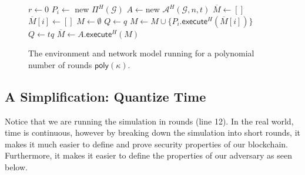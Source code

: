 \begin{figure}[H]
\begin{algorithm}[H]
    \caption{\label{alg.environment} The environment and network model running for a polynomial number of rounds $\textsf{poly}(\kappa)$.}
    \begin{algorithmic}[1]
        \State $r \leftarrow 0$
                \State $P_i \leftarrow$ {\textsf{new}} $\Pi^H(\mathcal{G})$
            \EndFor
            \State $A \leftarrow${\textsf{new}} $\mathcal{A}^H(\mathcal{G}, n, t)$
            \State $\overline{M} \leftarrow []$ 
                \State $\overline{M}[i] \leftarrow []$ 
            \EndFor
             
                \State $M \leftarrow \emptyset$
                 
                    \State $Q \leftarrow q$ 
                    \State $M \leftarrow M \cup \{P_i.\textsf{execute}^H(\overline{M}[i])\}$ 
                \EndFor
                \State $Q \leftarrow tq$ 
                \State $\overline{M} \leftarrow A.\textsf{execute}^H(M)$
                        \label{alg.environment.connectivity}
                    \EndFor
                \EndFor
            \EndFor
        \EndFunction
        \vskip8pt
    \end{algorithmic}
\end{algorithm}
\end{figure}

\subsection{A Simplification: Quantize Time}
Notice that we are running the simulation in rounds (line 12). In the real world, time is continuous, however by breaking down the simulation into short rounds, it makes it much easier to define and prove security properties of our blockchain. Furthermore, it makes it easier to define the properties of our adversary as seen below.

